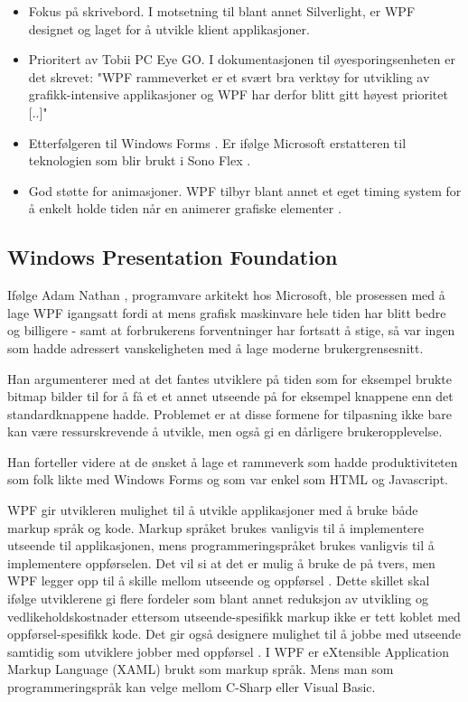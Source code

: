 \begin{itemize}
\item Fokus på skrivebord. I motsetning til blant annet Silverlight, er WPF designet og laget for å utvikle klient applikasjoner\cite{Windo777:online}.
\item Prioritert av Tobii PC Eye GO. I dokumentasjonen til øyesporingsenheten er det skrevet: "WPF  rammeverket er et svært bra verktøy for utvikling av grafikk-intensive applikasjoner og WPF har derfor blitt gitt høyest prioritet [..]"
\item Etterfølgeren til Windows Forms . Er ifølge Microsoft erstatteren til teknologien som blir brukt i Sono Flex \cite{User1111:online}. 
\item God støtte for animasjoner. WPF tilbyr blant annet et eget timing system for å enkelt holde tiden når en animerer grafiske elementer \cite{Anima7:online}.
\end{itemize}




 
\subsection{Windows Presentation Foundation} 
 
Ifølge Adam Nathan \cite[p.~9]{WPFbook}, programvare arkitekt hos Microsoft, ble prosessen med å lage WPF igangsatt fordi at mens grafisk maskinvare hele tiden har blitt bedre og billigere - samt at forbrukerens forventninger har fortsatt å stige, så var ingen som hadde adressert vanskeligheten med å lage moderne brukergrensesnitt.  

Han argumenterer med at det fantes utviklere på tiden som for eksempel brukte bitmap bilder til for å få et et annet utseende på for eksempel knappene enn det standardknappene hadde. Problemet er at disse formene for tilpasning ikke bare kan være ressurskrevende å utvikle, men også gi en dårligere brukeropplevelse. 

Han forteller videre at de ønsket å lage et rammeverk som hadde produktiviteten som folk likte med Windows Forms og som var enkel som HTML og Javascript.

WPF gir utvikleren mulighet til å utvikle applikasjoner med å bruke både markup språk og kode. Markup språket brukes vanligvis til å implementere utseende til applikasjonen, mens programmeringspråket brukes vanligvis til å implementere oppførselen. Det vil si at det er mulig å bruke de på tvers, men WPF legger opp til å skille mellom utseende og oppførsel \cite{Intro8:online}. Dette skillet skal ifølge utviklerene gi flere fordeler som blant annet reduksjon av utvikling og vedlikeholdskostnader ettersom utseende-spesifikk markup ikke er tett koblet med oppførsel-spesifikk kode. Det gir også designere mulighet til å jobbe med utseende samtidig som utviklere jobber med oppførsel \cite{Intro8:online}. I WPF er eXtensible Application Markup Language (XAML) brukt som markup språk. Mens man som programmeringspråk kan velge mellom C-Sharp eller Visual Basic.

